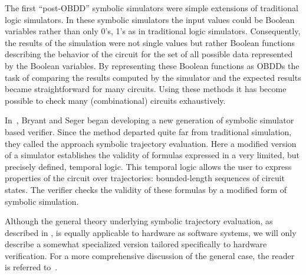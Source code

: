 The first ``post-OBDD'' symbolic simulators were simple extensions
of traditional logic simulators. In these symbolic simulators the
input values could be Boolean variables rather than only 0's, 1's
as in traditional logic simulators.  Consequently, the results of
the simulation were not single values but rather Boolean functions
describing the behavior of the circuit for the set of all possible
data represented by the Boolean variables. By representing these
Boolean functions as OBDDs the task of
comparing the results computed by the simulator and the expected
results became straightforward for many circuits. Using these
methods it has become possible to check many (combinational) circuits
exhaustively.

In~\cite{bryant-cav90,SegBry95}, Bryant and Seger began developing
a new generation of symbolic simulator based verifier.
Since the method departed quite far from traditional simulation,
they called the approach symbolic trajectory evaluation.
Here a modified version of a simulator establishes the validity
of formulas expressed in a very limited, but precisely defined, temporal logic.
This temporal logic allows the user to express properties of the circuit
over trajectories: bounded-length sequences of circuit states.
The verifier checks the validity of these formulas by a modified form
of symbolic simulation.

Although the general theory underlying symbolic trajectory evaluation,
as described in \cite{SegBry95}, is equally applicable to hardware as
software systems, we will only describe a somewhat specialized
version tailored specifically to hardware verification. For a more
comprehensive discussion of the general case, the reader is referred
to~\cite{SegBry95}.

